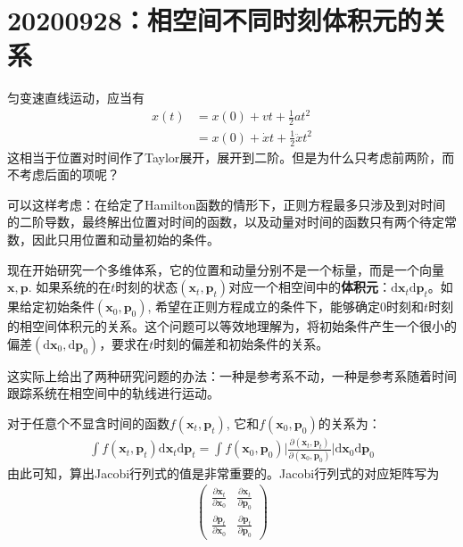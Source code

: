 \documentclass[12pt]{article}
\begin{document}
\section{20200928：相空间不同时刻体积元的关系}
    匀变速直线运动，应当有
    \begin{align*}
        x(t) &= x(0) + vt + \frac 12 at^2\\
        &= x(0) + \dot{x}t + \frac 12 \ddot{x}t^2
    \end{align*}
    这相当于位置对时间作了Taylor展开，展开到二阶。但是为什么只考虑前两阶，而不考虑后面的项呢？

    可以这样考虑：在给定了Hamilton函数的情形下，正则方程最多只涉及到对时间的二阶导数，最终解出位置对时间的函数，以及动量对时间的函数只有两个待定常数，因此只用位置和动量初始的条件。

    现在开始研究一个多维体系，它的位置和动量分别不是一个标量，而是一个向量$\bm{x}, \bm{p}$. 如果系统的在$t$时刻的状态$(\bm{x}_t,\bm{p}_t)$对应一个相空间中的\textbf{体积元}：$\mathrm{d}\bm{x}_t\mathrm{d}\bm{p}_t$。如果给定初始条件$(\bm{x}_0,\bm{p}_0)$, 希望在正则方程成立的条件下，能够确定0时刻和$t$时刻的相空间体积元的关系。这个问题可以等效地理解为，将初始条件产生一个很小的偏差$(\mathrm{d}\bm{x}_0,\mathrm{d}\bm{p}_0)$，要求在$t$时刻的偏差和初始条件的关系。

    这实际上给出了两种研究问题的办法：一种是参考系不动，一种是参考系随着时间跟踪系统在相空间中的轨线进行运动。

    对于任意个不显含时间的函数$f(\bm{x}_t,\bm{p}_t)$, 它和$f(\bm{x}_0,\bm{p}_0)$的关系为：
    \begin{align*}
        \int f(\bm{x}_t,\bm{p}_t) \mathrm{d}\bm{x}_t\mathrm{d}\bm{p}_t = \int f(\bm{x}_0,\bm{p}_0)\bigg|\frac {\partial (\bm{x}_t, \bm{p}_t)}{\partial (\bm{x}_0,\bm{p}_0)}\bigg| \mathrm{d}\bm{x}_0 \mathrm{d}\bm{p}_0
    \end{align*}
    由此可知，算出Jacobi行列式的值是非常重要的。Jacobi行列式的对应矩阵写为
    \begin{align*}
        \begin{pmatrix}
            \frac {\partial \bm{x}_t}{\partial \bm{x}_0} & \frac {\partial \bm{x}_t}{\partial \bm{p}_0}\\
            \frac {\partial \bm{p}_t}{\partial \bm{x}_0} & \frac {\partial \bm{p}_t}{\partial \bm{p}_0}
        \end{pmatrix}
    \end{align*}
\end{document}
